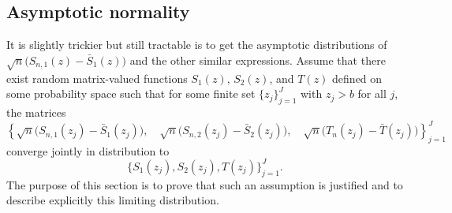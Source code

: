 \subsection{Asymptotic normality}

It is slightly trickier but still tractable is to get the asymptotic distributions
of $\sqrt{n} \big( S_{n,1}(z) - \bar S_1 (z) \big)$ and the other similar expressions.
Assume that there exist random matrix-valued functions 
$S_1(z)$, $S_2(z)$, and $T(z)$ defined on some probability space
such that for some finite set $\{ z_j \}_{j=1}^J$ with $z_j > b$ for all $j$, 
the matrices
\begin{equation*}
    \left\{ 
        \sqrt{n} \big( S_{n,1}(z_j) - \bar S_1 (z_j) \big), \quad
        \sqrt{n} \big( S_{n,2}(z_j) - \bar S_2 (z_j) \big), \quad
        \sqrt{n} \big( T_n(z_j) - \bar T (z_j) \big) 
    \right\}_{j=1}^{J}
\end{equation*}
converge jointly in distribution to
\[
    \Big\{
        S_1(z_j), S_2(z_j), T(z_j)
    \Big\}_{j=1}^{J}.
\]
The purpose of this section is to prove that such an assumption is justified
and to describe explicitly this limiting distribution. 

